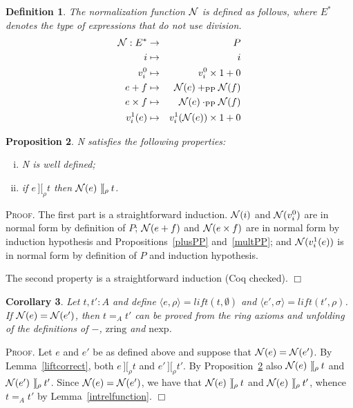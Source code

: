 \documentclass{article}
\newtheorem{definition}{Definition}[section]
\newtheorem{corollary}[definition]{Corollary}
\newtheorem{proposition}[definition]{Proposition}
\newenvironment{proof}{\smallskip\textsc{Proof.}}{\hspace*{\fill}$\Box$}
\newcommand{\intII}{\,]\![}
\newcommand{\intrel}{\mathbin{\intII_{\rho}}}
\newcommand{\N}{{\cal N}}
\newcommand{\zring}{\ensuremath{\mathrm{zring}}}
\newcommand{\nexp}{\ensuremath{\mathrm{nexp}}}
\newcommand{\lift}{\ensuremath{\mathit{lift}}}
\newcommand{\plusPP}{\ensuremath{+_{\mathrm{PP}}}}
\newcommand{\multPP}{\ensuremath{\cdot_{\mathrm{PP}}}}
\begin{document}
\begin{definition}\label{defn:NormR}
The normalization function $\N$ is defined as follows, where $E^\ast$ denotes
the type of expressions that do not use division.
\begin{eqnarray*}
\N : E^\ast & \to & P \\
 i & \mapsto & i \\
 v^0_i & \mapsto & v^0_i\times 1+0 \\
 e+f & \mapsto & \N(e)\plusPP\N(f) \\
 e\times f& \mapsto & \N(e)\multPP\N(f) \\
 v^1_i(e) & \mapsto & v^1_i(\N(e))\times 1+0
\end{eqnarray*}
\end{definition}
\begin{proposition}\label{NormR} {\N} satisfies the following properties:
\begin{enumerate}[(i)]
\item {\N} is well defined;
\item\label{normpresint} if $e\intrel t$ then $\N(e)\intrel t$.
\end{enumerate}
\end{proposition}
\begin{proof}
The first part is a straightforward induction.  $\N(i)$ and $\N(v^0_i)$ are
in normal form by definition of $P$; $\N(e+f)$ and $\N(e\times f)$ are
in normal form by induction hypothesis and Propositions~\ref{plusPP}
and~\ref{multPP}; and $\N(v^1_i(e))$ is in normal form by definition of $P$
and induction hypothesis.

The second property is a straightforward induction (Coq checked).
\end{proof}

\begin{corollary}\label{correctness}
Let $t,t':A$ and define $\langle e,\rho\rangle=\lift(t,\emptyset)$ and
$\langle e',\sigma\rangle=\lift(t',\rho)$.  If $\N(e)=\N(e')$, then
$t=_A t'$ can be proved from the ring axioms and unfolding of
the definitions of $-$, {\zring} and {\nexp}.
\end{corollary}
\begin{proof}
Let $e$ and $e'$ be as defined above and suppose that $\N(e)=\N(e')$.
By Lemma~\ref{liftcorrect}, both $e\intrel t$ and $e'\intrel t'$.
By Proposition~\ref{NormR} also $\N(e)\intrel t$ and $\N(e')\intrel t'$.
Since $\N(e)=\N(e')$, we have that $\N(e)\intrel t$ and $\N(e)\intrel t'$,
whence $t=_A t'$ by Lemma~\ref{intrelfunction}.
\end{proof}
\end{document}
